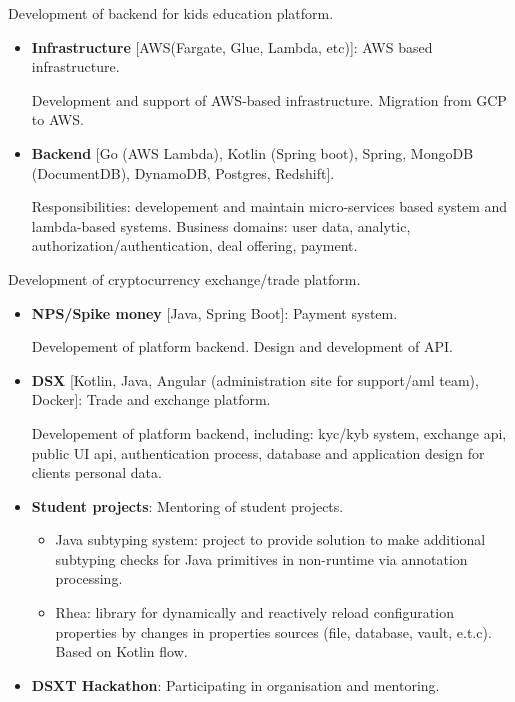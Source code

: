 \documentclass{cv}
\begin{document}
\begin{cvblock}{%
		}

	Development of backend for kids education platform.

	\begin{itemize}
		\item \textbf{Infrastructure} [AWS(Fargate, Glue, Lambda, etc)]: AWS based infrastructure.

		      Development and support of AWS-based infrastructure. Migration from GCP to AWS.

		\item \textbf{Backend} [Go (AWS Lambda), Kotlin (Spring boot), Spring, MongoDB (DocumentDB), DynamoDB, Postgres, Redshift].

		      Responsibilities: developement and maintain micro-services based system and lambda-based systems. Business domains:
		      user data, analytic, authorization/authentication, deal offering, payment.
	\end{itemize}
\end{cvblock}

\begin{cvblock}{%
		}

	Development of cryptocurrency exchange/trade platform.

	\begin{itemize}
		\item \textbf{NPS/Spike money} [Java, Spring Boot]: Payment system.

		      Developement of platform backend. Design and development of API.
		\item \textbf{DSX} [Kotlin, Java, Angular (administration site for support/aml team), Docker]: Trade and exchange platform.

		      Developement of platform backend, including:
		      kyc/kyb system, exchange api, public UI api, authentication process,
		      database and application design for clients personal data.
		\item \textbf{Student projects}: Mentoring of student projects.
		      \begin{itemize}
			      \item Java subtyping system: project to provide solution to make additional
			            subtyping checks for Java primitives in non-runtime via annotation processing.
			      \item Rhea: library for dynamically and reactively reload configuration properties
			            by changes in properties sources (file, database, vault, e.t.c). Based on
			            Kotlin flow.
		      \end{itemize}
		\item \textbf{DSXT Hackathon}: Participating in organisation and mentoring.
	\end{itemize}
\end{cvblock}
\end{document}
